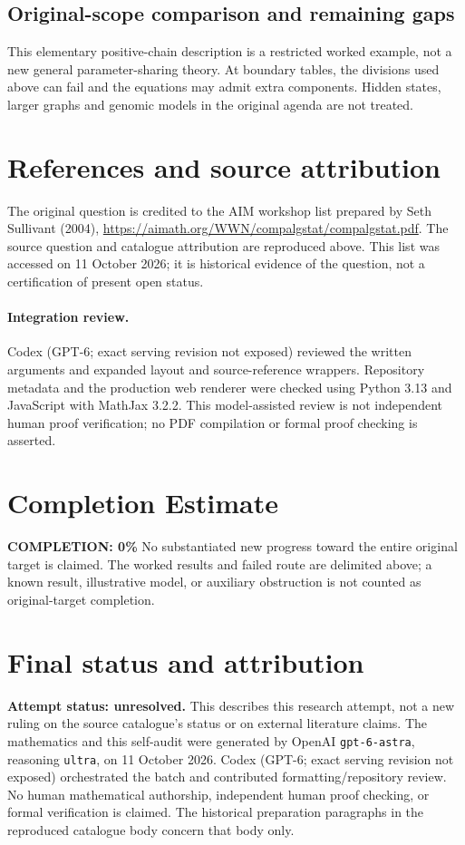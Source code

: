 \documentclass[11pt]{article}
\begin{document}
\subsection{Original-scope comparison and remaining gaps}
This elementary positive-chain description is a restricted worked example, not a new general parameter-sharing theory. At boundary tables, the divisions used above can fail and the equations may admit extra components. Hidden states, larger graphs and genomic models in the original agenda are not treated.

\section{References and source attribution}
The original question is credited to the AIM workshop list prepared by Seth Sullivant (2004), \url{https://aimath.org/WWN/compalgstat/compalgstat.pdf}. The source question and catalogue attribution are reproduced above. This list was accessed on 11 October 2026; it is historical evidence of the question, not a certification of present open status.


\paragraph{Integration review.} Codex (GPT-6; exact serving revision not exposed) reviewed the written arguments and expanded layout and source-reference wrappers. Repository metadata and the production web renderer were checked using Python 3.13 and JavaScript with MathJax 3.2.2. This model-assisted review is not independent human proof verification; no PDF compilation or formal proof checking is asserted.

\section{Completion Estimate}
\noindent\textbf{COMPLETION: 0\%}
No substantiated new progress toward the entire original target is claimed. The worked results and failed route are delimited above; a known result, illustrative model, or auxiliary obstruction is not counted as original-target completion.

\section{Final status and attribution}
\textbf{Attempt status: unresolved.} This describes this research attempt, not a new ruling on the source catalogue's status or on external literature claims.
The mathematics and this self-audit were generated by OpenAI \texttt{gpt-6-astra}, reasoning \texttt{ultra}, on 11 October 2026. Codex (GPT-6; exact serving revision not exposed) orchestrated the batch and contributed formatting/repository review. No human mathematical authorship, independent human proof checking, or formal verification is claimed. The historical preparation paragraphs in the reproduced catalogue body concern that body only.
\end{document}
